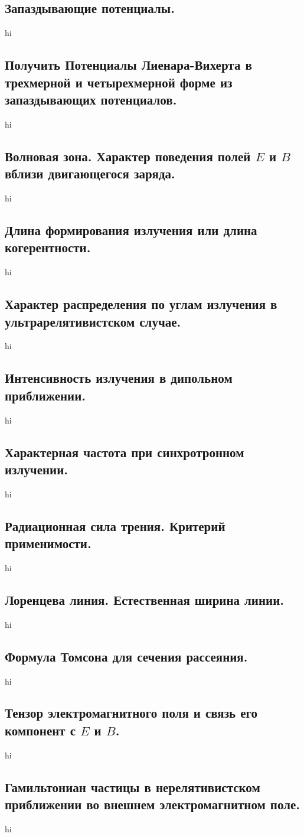 \documentclass[a4paper,12pt]{article}
\begin{document}
\subsection{Запаздывающие потенциалы.}
hi
\subsection{Получить Потенциалы Лиенара-Вихерта в трехмерной и четырехмерной
форме из запаздывающих потенциалов.}
hi
\subsection{Волновая зона. Характер поведения полей $E$ и $B$ вблизи
двигающегося заряда.}
hi
\subsection{Длина формирования излучения или длина когерентности.}
hi
\subsection{Характер распределения по углам излучения в ультрарелятивистском
случае.}
hi
\subsection{Интенсивность излучения в дипольном приближении.}
hi
\subsection{Характерная частота при синхротронном излучении.}
hi
\subsection{Радиационная сила трения. Критерий применимости.}
hi
\subsection{Лоренцева линия. Естественная ширина линии.}
hi
\subsection{Формула Томсона для сечения рассеяния.}
hi
\subsection{Тензор электромагнитного поля и связь его компонент с $E$ и $B$.}
hi
\subsection{Гамильтониан частицы в нерелятивистском приближении во внешнем
электромагнитном поле.}
hi
\end{document}
